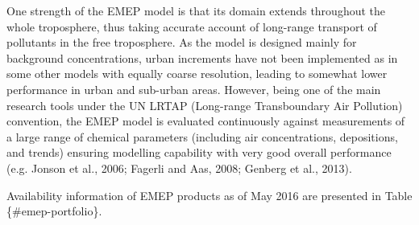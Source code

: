 \documentclass[9pt]{report}
\begin{document}
One strength of the EMEP model is that its domain extends throughout the whole troposphere, thus taking accurate account of long-range transport of pollutants in the free troposphere. 
As the model is designed mainly for background concentrations, urban increments have not been implemented as in some other models with equally coarse resolution, leading to somewhat lower performance in urban and sub-urban areas. 
However, being one of the main research tools under the UN LRTAP (Long-range Transboundary Air Pollution) convention, the EMEP model is evaluated continuously against measurements of a large range of chemical parameters (including air concentrations, depositions, and trends) ensuring modelling capability with very good overall performance (e.g. Jonson et al., 2006; Fagerli and Aas, 2008; Genberg et al., 2013).%

Availability information of EMEP products as of May 2016 are presented in Table \{\#emep-portfolio\}.%

\begin{table}[h!]%
\begin{mdcenter}%
{}%
\end{mdcenter}\label{emep-portfolio}%
\end{table}%
\end{document}
